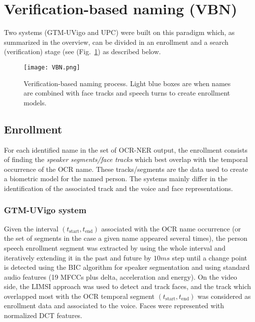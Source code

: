 \section{Verification-based naming (VBN)}
\label{sec:verification}

Two systems (GTM-UVigo and UPC) were built on this paradigm which, 
as summarized in the overview, can be divided in an enrollment and a 
search (verification) stage (see (Fig.~\ref{fig:vbn}) 
as described below.

\begin{figure}[tb]
 \centering
 \texttt{[image: VBN.png]}
\vspace*{-7mm}
 \caption{Verification-based naming process. Light blue boxes are when names are combined with face tracks and speech turns to create enrollment models.}
\vspace*{-3mm}
 \label{fig:vbn}
\end{figure}

\subsection{Enrollment}


For each identified name in the set of OCR-NER output, the enrollment consists of finding the  \textit{speaker segments/face tracks} 
which best overlap with the temporal occurrence of the OCR name. 
These tracks/segments are the data used to create a biometric model for the named person. 
%
The systems mainly differ in the identification of the associated track and the voice and face  representations.


\subsubsection{GTM-UVigo system}
%
Given the interval  $(t_{\mathrm{start}},t_{\mathrm{end}})$ associated with the OCR name occurrence (or the set 
of segments in the case a given name appeared several times), the person speech enrollment segment was extracted by 
using the whole interval and iteratively  extending it in the past and future  by $10ms$ step until a change point 
is detected using the BIC algorithm for speaker segmentation and using standard audio features (19 MFCCs plus delta, acceleration and energy).
%
On the video side, the LIMSI approach was used to detect and track faces, and the track which overlapped most with the OCR temporal 
segment  $(t_{\mathrm{start}},t_{\mathrm{end}})$ was considered as enrollment data and associated to the voice.
Faces were represented with normalized DCT features.

